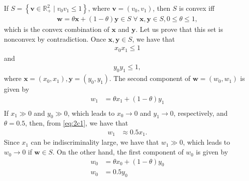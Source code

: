 \documentclass[12pt,a4paper]{article}
\begin{document}
If \(S = \left\{ \mathbf{v} \in \mathbb{R}_{+}^{2} \mid v_0v_1 \leq 1 \right\}\), where \(\mathbf{v} = (v_0, v_1)\), then \(S\) is convex iff
\begin{align}
    \mathbf{w} = \theta \mathbf{x} + (1-\theta)\mathbf{y} \in S \;\forall\; \mathbf{x}, \mathbf{y} \in S, 0\leq\theta\leq 1,
    \label{eq:convex-rule}
\end{align}
which is the convex combination of \(\mathbf{x}\) and \(\mathbf{y}\). Let us prove that this set is nonconvex by contradiction. Once \(\mathbf{x}, \mathbf{y} \in S\), we have that
\begin{align}
    x_0x_1 \leq 1
\end{align}
and
\begin{align}
    y_0y_1 \leq 1,
\end{align}
where \(\mathbf{x} = (x_0, x_1), \mathbf{y} = (y_0, y_1)\). The second component of \(\mathbf{w} = (w_0, w_1)\) is given by
\begin{align}
    \label{eq:2c1}
    w_1 & = \theta x_1 + (1-\theta)y_1 \\
\end{align}
If \(x_1 \gg 0\) and \(y_0 \gg 0\), which leads to \(x_0 \rightarrow 0\) and \(y_1 \rightarrow 0\), respectively, and \(\theta = 0.5\), then, from \eqref{eq:2c1}, we have that
\begin{align}
    w_1 & \approx 0.5 x_1.
\end{align}
Since \(x_1\) can be indiscriminality large, we have that \(w_1 \gg 0\), which leads to \(w_0 \rightarrow 0\) if \(\mathbf{w} \in S\). On the other hand, the first component of \(w_0\) is given by
\begin{align}
    \label{eq:2c2}
    w_0 & = \theta x_0 + (1-\theta)y_0 \\
    w_0 & = 0.5y_0
\end{align}
\end{document}
